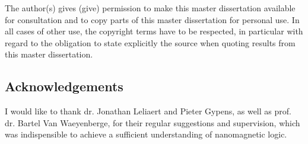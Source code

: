 \documentclass[11pt,a4paper,english,twoside]{article}
\begin{document}
\shipout\null %

\newpage
\begin{center}
    The author(s) gives (give) permission to make this master dissertation available for consultation and to copy parts of this master dissertation for personal use. In all cases of other use, the copyright terms have to be respected, in particular with regard to the obligation to state explicitly the source when quoting results from this master dissertation.
\end{center}
\subsection*{Acknowledgements}
I would like to thank dr. Jonathan Leliaert and Pieter Gypens, as well as prof. dr. Bartel Van Waeyenberge, for their regular suggestions and supervision, which was indispensible to achieve a sufficient understanding of nanomagnetic logic.
\end{document}
